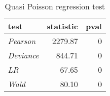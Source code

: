 \begin{table}[H]

\caption{\label{tab:quasipoisson_reg_tests}Quasi Poisson regression test}
\centering
\begin{tabular}[t]{>{}l|r|r}
\hline
test & statistic & pval\\
\hline
\em{Pearson} & 2279.87 & 0\\
\hline
\em{Deviance} & 844.71 & 0\\
\hline
\em{LR} & 67.65 & 0\\
\hline
\em{Wald} & 80.10 & 0\\
\hline
\end{tabular}
\end{table}
